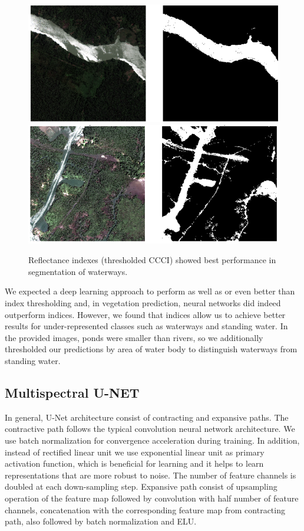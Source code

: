 \documentclass[10pt,twocolumn,letterpaper]{article}
\begin{document}
\begin{figure}[!h]
	\captionsetup{justification=centering}
	\centering
	\includegraphics[scale=0.27]{water}
	\includegraphics[scale=0.27]{water2}
	\caption{ Reflectance indexes (thresholded CCCI) showed best performance in segmentation of waterways.}
	\label{fig:ccci}
\end{figure}

We expected a deep learning approach to perform as well as or even better than index thresholding and, in vegetation prediction, neural networks did indeed outperform indices. However, we found that indices allow us to achieve better results for under-represented classes such as waterways and standing water. In the provided images, ponds were smaller than rivers, so we additionally thresholded our predictions by area of water body to distinguish waterways from standing water.

\subsection{Multispectral U-NET}

In general, U-Net architecture consist of contracting and expansive paths. The contractive path follows the typical convolution neural network architecture.
We use batch normalization \cite{batchnorm} for convergence acceleration during training. In addition, instead of rectified linear unit we use exponential linear \cite{elu} unit as primary activation function, which is beneficial for learning and it helps to learn representations that are more robust to noise. The number of feature channels is doubled at each down-sampling step. Expansive path consist of upsampling operation of the feature map followed by convolution with half number of feature channels, concatenation with the corresponding feature map from contracting path, also followed by batch normalization and ELU. 
\end{document}
